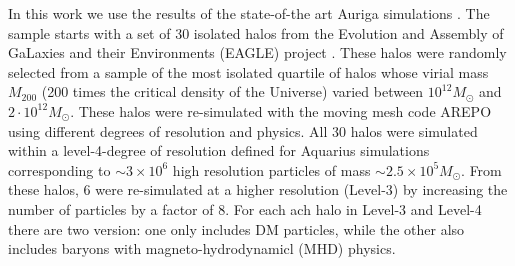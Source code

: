\documentclass[a4paper,fleqn,usenatbib]{mnras}
\begin{document}
In this work we use the results of the state-of-the art Auriga
simulations \cite{auriga}. 
The sample starts with a set of 30 isolated halos from the Evolution
and Assembly of GaLaxies and their Environments (EAGLE) project \cite{Eagle}. 
These halos were randomly selected from a sample of the most isolated
quartile of halos whose virial mass $M_{200}$ (200 times the critical
density of the Universe) varied between $10^{12}M_\odot$ and $2\cdot
10^{12}M_\odot$.
These halos were re-simulated with the moving mesh code AREPO
\citep{arepo} using different degrees of resolution and physics.
All 30 halos were simulated within a level-4-degree of
resolution defined for Aquarius simulations corresponding to $\sim
3\times 10^6$ high resolution particles of mass $\sim 2.5 \times 10^5
M_\odot$. 
From these halos, 6 were re-simulated at a higher resolution (Level-3)
by increasing the number of particles by a factor of $8$.
For each ach halo in Level-3 and Level-4 there are two version: one
only includes DM particles, while the other also includes baryons with
magneto-hydrodynamicl (MHD) physics.




\end{document}
